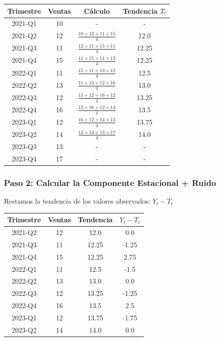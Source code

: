 \documentclass[12pt]{article}
\begin{document}
\begin{center}
\begin{tabular}{|c|c|c|c|}
\hline
\textbf{Trimestre} & \textbf{Ventas} & \textbf{Cálculo} & \textbf{Tendencia $T_t$} \\
\hline
2021-Q1 & 10 & - & - \\
2021-Q2 & 12 & $\frac{10 + 12 + 11 + 15}{4}$ & 12.0 \\
2021-Q3 & 11 & $\frac{12 + 11 + 15 + 11}{4}$ & 12.25 \\
2021-Q4 & 15 & $\frac{11 + 15 + 11 + 13}{4}$ & 12.25 \\
2022-Q1 & 11 & $\frac{15 + 11 + 13 + 12}{4}$ & 12.5 \\
2022-Q2 & 13 & $\frac{11 + 13 + 12 + 16}{4}$ & 13.0 \\
2022-Q3 & 12 & $\frac{13 + 12 + 16 + 12}{4}$ & 13.25 \\
2022-Q4 & 16 & $\frac{12 + 16 + 12 + 14}{4}$ & 13.5 \\
2023-Q1 & 12 & $\frac{16 + 12 + 14 + 13}{4}$ & 13.75 \\
2023-Q2 & 14 & $\frac{12 + 14 + 13 + 17}{4}$ & 14.0 \\
2023-Q3 & 13 & - & - \\
2023-Q4 & 17 & - & - \\
\hline
\end{tabular}
\end{center}

\subsubsection{Paso 2: Calcular la Componente Estacional + Ruido}

Restamos la tendencia de los valores observados: $Y_t - T_t$

\begin{center}
\begin{tabular}{|c|c|c|c|}
\hline
\textbf{Trimestre} & \textbf{Ventas} & \textbf{Tendencia} & \textbf{$Y_t - T_t$} \\
\hline
2021-Q2 & 12 & 12.0 & 0.0 \\
2021-Q3 & 11 & 12.25 & -1.25 \\
2021-Q4 & 15 & 12.25 & 2.75 \\
2022-Q1 & 11 & 12.5 & -1.5 \\
2022-Q2 & 13 & 13.0 & 0.0 \\
2022-Q3 & 12 & 13.25 & -1.25 \\
2022-Q4 & 16 & 13.5 & 2.5 \\
2023-Q1 & 12 & 13.75 & -1.75 \\
2023-Q2 & 14 & 14.0 & 0.0 \\
\hline
\end{tabular}
\end{center}
\end{document}
